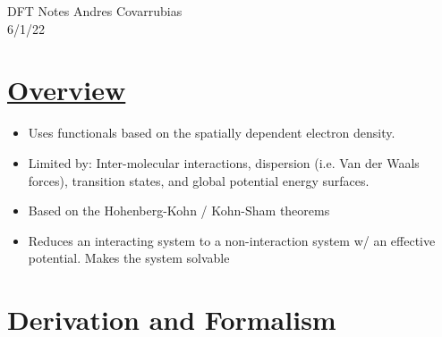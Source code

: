 \documentclass[12pt]{article}
\begin{document}
\noindent DFT Notes \hfill Andres Covarrubias    \\
6/1/22

\hrulefill
\section*{\href{https://en.wikipedia.org/wiki/Density_functional_theory}{Overview}} %
\begin{itemize}
    \item Uses functionals based on the spatially dependent electron density.
    \item Limited by: Inter-molecular interactions, dispersion (i.e. Van der Waals forces), transition states, and global potential energy surfaces. 
    \item Based on the Hohenberg-Kohn / Kohn-Sham theorems
    \item Reduces an interacting system to a non-interaction system w/ an effective potential. Makes the system solvable
\end{itemize}

\section{Derivation and Formalism} %
\end{document}
